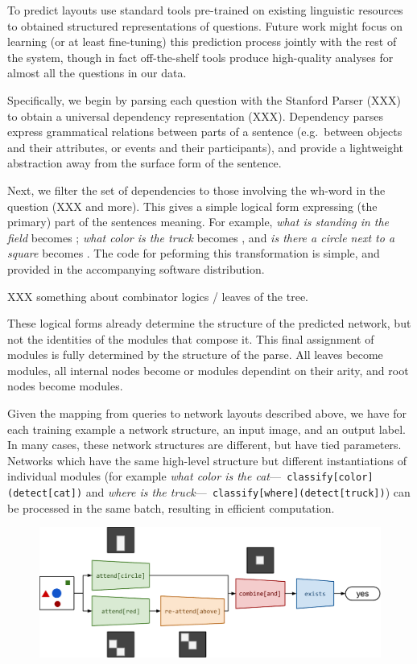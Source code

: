 \documentclass[10pt,twocolumn,letterpaper]{article}
\begin{document}
To predict layouts use standard tools pre-trained on existing linguistic
resources to obtained structured representations of questions. Future work might
focus on learning (or at least fine-tuning) this prediction process jointly with
the rest of the system, though in fact off-the-shelf tools produce high-quality
analyses for almost all the questions in our data.

Specifically, we begin by parsing each question with the Stanford Parser (XXX)
to obtain a universal dependency representation (XXX). Dependency parses express
grammatical relations between parts of a sentence (e.g.\ between objects and
their attributes, or events and their participants), and provide a lightweight
abstraction away from the surface form of the sentence.

Next, we filter the set of dependencies to those involving the wh-word in the
question (XXX and more). This gives a simple logical form expressing (the
primary) part of the sentences meaning. For example, \emph{what is standing in
the field} becomes ; \emph{what color is the truck} becomes
, and \emph{is there a circle next to a square} becomes
. The code for peforming this transformation is
simple, and provided in the accompanying software distribution.

XXX something about combinator logics / leaves of the tree.

These logical forms already determine the structure of the predicted network,
but not the identities of the modules that compose it. This final assignment of
modules is fully determined by the structure of the parse. All leaves become
 modules, all internal nodes become  or 
modules dependint on their arity, and root nodes become  modules.

Given the mapping from queries to network layouts described above, we have for
each training example a network structure, an input image, and an output label.
In many cases, these network structures are different, but have tied parameters.
Networks which have the same high-level structure but different instantiations
of individual modules (for example \emph{what color is the cat}---{\small\tt
classify[color](detect[cat])} and \emph{where is the truck}---{\small\tt
classify[where](detect[truck])}) can be processed in the same batch, resulting
in efficient computation.


\begin{figure}
    \includegraphics[width=\textwidth]{fig/full2}
\end{figure}
\end{document}
